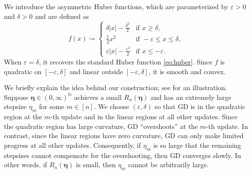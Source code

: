 \documentclass[11pt]{article}
\newcommand{\N}{\mathbb{N}}
\newcommand{\abs}[1]{\left\lvert#1\right\rvert}
\newcommand{\schedule}{\bm{\eta}}
\begin{document}
We introduce the asymmetric Huber functions, which are parameterized by $\varepsilon>0$ and $\delta>0$ and are defined as
\begin{equation}\label{eq:asymmetric_huber}
	f(x) \coloneqq \begin{cases}
		\delta\abs{x} - \frac{ \delta^2 }{2} &\text{if }x\geq\delta, \\
		\frac{1}{2}x^2 &\text{if }-\varepsilon \leq x \leq \delta, \\
		\varepsilon\abs{x} - \frac{ \varepsilon^2 }{2} &\text{if }x\leq-\varepsilon.
	\end{cases}
\end{equation}
When $\varepsilon=\delta$, it recovers the standard Huber function \eqref{eq:huber}.
Since $f$ is quadratic on $[-\varepsilon,\delta]$ and linear outside $[-\varepsilon,\delta]$, it is smooth and convex.


We briefly explain the idea behind our construction;
see  for an illustration.
Suppose $\schedule\in(0,\infty)^{\N}$ achieves a small $R_n(\schedule)$ and has an extremely large stepsize $\eta_m$ for some $m\in[n]$.
We choose $(\varepsilon,\delta)$ so that GD is in the quadratic region at the $m$-th update and in the linear regions at all other updates.
Since the quadratic region has large curvature, GD ``overshoots'' at the $m$-th update.
In contrast, since the linear regions have zero curvature, GD can only make limited progress at all other updates.
Consequently, if $\eta_m$ is so large that the remaining stepsizes cannot compensate for the overshooting, then GD converges slowly.
In other words, if $R_n(\schedule)$ is small, then $\eta_m$ cannot be arbitrarily large.
\end{document}
